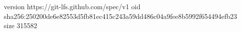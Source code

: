 version https://git-lfs.github.com/spec/v1
oid sha256:250200de6e82553d5fb81ec415c243a59dd486c04a9fee8b5992f654494efb23
size 315582
